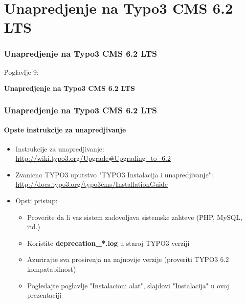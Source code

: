 %

\section{Unapredjenje na Typo3 CMS 6.2 LTS}
\begin{frame}[fragile]
	\frametitle{Unapredjenje na Typo3 CMS 6.2 LTS}

	\begin{center}\huge{Poglavlje 9:}\end{center}
	\begin{center}\huge{\color{typo3darkgrey}\textbf{Unapredjenje na Typo3 CMS 6.2 LTS}}\end{center}

\end{frame}


\begin{frame}[fragile]
	\frametitle{Unapredjenje na Typo3 CMS 6.2 LTS}
	\framesubtitle{Opste instrukcije za unapredjivanje}

	\begin{itemize}

		\item Instrukcije za unapredjivanje:\newline
			\smaller\url{http://wiki.typo3.org/Upgrade#Upgrading_to_6.2}\normalsize
		\item Zvanicno TYPO3 uputstvo "TYPO3 Instalacija i unapredjivanje":
			\smaller\url{http://docs.typo3.org/typo3cms/InstallationGuide}\normalsize
		\item Opsti pristup:
			\begin{itemize}
				\item Proverite da li vas sistem zadovoljava sistemske zahteve \small(PHP, MySQL, itd.)\normalsize
				\item Koristite \textbf{deprecation\_*.log} u staroj TYPO3 verziji
				\item Azurirajte sva prosirenja na najnovije verzije\newline
					\small(proveriti TYPO3 6.2 kompatabilnost)\normalsize
				\item Pogledajte poglavlje "Instalacioni alat", slajdovi "Instalacija" u ovoj prezentaciji
			\end{itemize}
	\end{itemize}

\end{frame}


